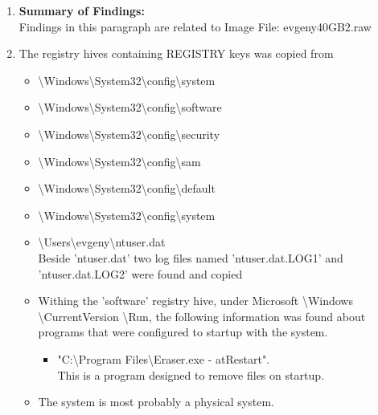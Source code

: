 \begin{enumerate}
\item \textbf{Summary of Findings:}\\
Findings in this paragraph are related to Image File: evgeny\textunderscore 40GB\textunderscore 2.raw

	\item The registry hives containing REGISTRY keys was copied from 
	\begin{itemize}
		\item \textbackslash Windows\textbackslash System32\textbackslash config\textbackslash system\\ 
		\item \textbackslash Windows\textbackslash System32\textbackslash config\textbackslash software\\
		\item \textbackslash Windows\textbackslash System32\textbackslash config\textbackslash security\\
		\item \textbackslash Windows\textbackslash System32\textbackslash config\textbackslash sam \\
		\item \textbackslash Windows\textbackslash System32\textbackslash config\textbackslash default \\
		\item \textbackslash Windows\textbackslash System32\textbackslash config\textbackslash system \\
		\item \textbackslash Users\textbackslash evgeny\textbackslash ntuser.dat \\
		Beside 'ntuser.dat' two log files named 'ntuser.dat.LOG1' and 'ntuser.dat.LOG2' were found and copied
		
		\item Withing the 'software' registry hive, under 
		Microsoft \textbackslash Windows \textbackslash CurrentVersion \textbackslash Run, the following information was found about programs that were configured to startup with the system.
		
		\begin{itemize}
			\item "C:\textbackslash Program Files\textbackslash Eraser.exe - atRestart".\\ 
				This is a program designed to remove files on startup.
		\end{itemize}
		
		\item The system is most probably a physical system.
		

\end{itemize}
\end{enumerate}
